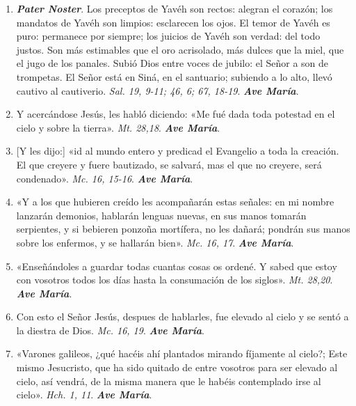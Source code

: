 \documentclass[../../devocionario.tex]{subfiles}
\begin{document}
    \begin{enumerate}
    
        \item \textbf{\textit{Pater Noster}}. Los preceptos de Yavéh son rectos: alegran el corazón; los mandatos de Yavéh son limpios: esclarecen los ojos. 
            El temor de Yavéh es puro: permanece por siempre; los juicios de Yavéh son verdad: del todo justos. Son más estimables que el oro acrisolado, más
            dulces que la miel, que el jugo de los panales. Subió Dios entre voces de jubilo: el Señor a son de trompetas. El Señor está en Siná, en el santuario; subiendo a lo alto, 
            llevó cautivo al cautiverio. \textit{Sal. 19, 9-11; 46, 6; 67, 18-19}. \textbf{\textit{Ave María}}.

        \item Y acercándose Jesús, les habló diciendo: «Me fué dada toda potestad en el cielo y sobre la tierra». \textit{Mt. 28,18}. \textbf{\textit{Ave María}}.

        \item {[Y les dijo:]} «id al mundo entero y predicad el Evangelio a toda la creación. El que creyere y fuere bautizado, 
            se salvará, mas el que no creyere, será condenado». \textit{Mc. 16, 15-16}. \textbf{\textit{Ave María}}.

        \item «Y a los que hubieren creído les acompañarán estas señales: en mi nombre lanzarán demonios, hablarán lenguas nuevas, en sus manos tomarán serpientes, 
            y si bebieren ponzoña mortífera, no les dañará; pondrán sus manos sobre los enfermos, y se hallarán bien». \textit{Mc. 16, 17}. \textbf{\textit{Ave María}}.

        \item «Enseñándoles a guardar todas cuantas cosas os ordené. Y sabed que estoy con vosotros todos 
            los días hasta la consumación de los siglos». \textit{Mt. 28,20}. \textbf{\textit{Ave María}}.

        \item Con esto el Señor Jesús, despues de hablarles, fue elevado al cielo y se sentó a la diestra de Dios. \textit{Mc. 16, 19}. \textbf{\textit{Ave María}}.

        \item «Varones galileos, ¿qué hacéis ahí plantados mirando fíjamente al cielo?; Este mismo Jesucristo, que ha sido quitado de entre vosotros 
            para ser elevado al cielo, así vendrá, de la misma manera que le habéis contemplado irse al cielo». \textit{Hch. 1, 11}. \textbf{\textit{Ave María}}.


\end{enumerate}
\end{document}
